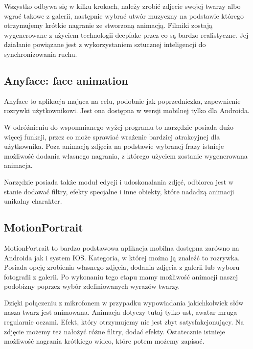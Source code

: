 Wszystko odbywa się w kilku krokach, należy zrobić zdjęcie swojej twarzy albo wgrać takowe z galerii, następnie wybrać utwór muzyczny na podstawie którego otrzymujemy krótkie nagranie ze stworzoną animacją. Filmiki zostają wygenerowane z użyciem technologii deepfake przez co są bardzo realistyczne. Jej działanie powiązane jest z wykorzystaniem sztucznej inteligencji do synchronizowania ruchu.


\subsection{Anyface: face animation}
Anyface \cite{anyface} to aplikacja mająca na celu, podobnie jak poprzedniczka, zapewnienie rozrywki użytkownikowi. Jest ona dostępna w wersji mobilnej tylko dla Androida.

W odróżnieniu do wspomnianego wyżej programu to narzędzie posiada dużo więcej funkcji, przez co może sprawiać wrażenie bardziej atrakcyjnej dla użytkownika. Poza animacją zdjęcia na podstawie wybranej frazy istnieje możliwość dodania własnego nagrania, z którego użyciem zostanie wygenerowana animacja. 

Narzędzie posiada także moduł edycji i udoskonalania zdjęć, odbiorca jest w stanie dodawać filtry, efekty specjalne i inne obiekty, które nadadzą animacji unikalny charakter. 


\subsection{MotionPortrait}
MotionPortrait \cite{motionportrait} to bardzo podstawowa aplikacja mobilna dostępna zarówno na Androida jak i system IOS. Kategoria, w której można ją znaleźć to rozrywka. Posiada opcję zrobienia własnego zdjęcia, dodania zdjęcia z galerii lub wyboru fotografii z galerii. Po wykonaniu tego etapu mamy możliwość animacji naszej podobizny poprzez wybór zdefiniowanych wyrazów twarzy. 

Dzięki połączeniu z mikrofonem w przypadku wypowiadania jakichkolwiek słów nasza twarz jest animowana. Animacja dotyczy tutaj tylko ust, awatar mruga regularnie oczami. Efekt, który otrzymujemy nie jest zbyt satysfakcjonujący. Na zdjęcie możemy też nałożyć różne filtry, dodać efekty. Ostatecznie istnieje możliwość nagrania krótkiego wideo, które potem możemy zapisać.

